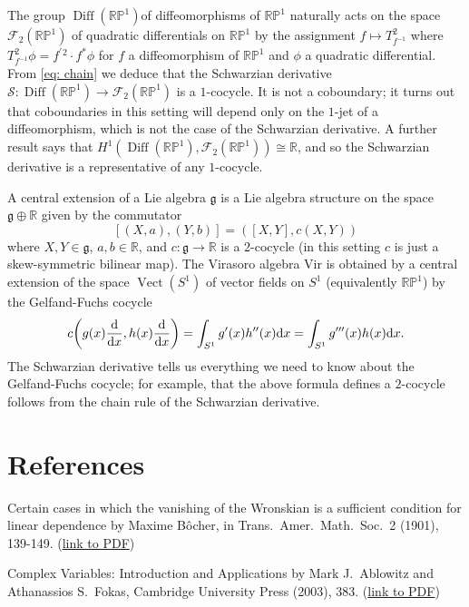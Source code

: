 \documentclass[11pt,leqno]{article}
\theoremstyle{plain}
\theoremstyle{definition}
\numberwithin{equation}{section}
\numberwithin{lem}{section}
\DeclareMathOperator{\Diff}{Diff}
\newcommand{\Vir}{\mathrm{Vir}}
\DeclareMathOperator{\Vect}{Vect}
\begin{document}
The group $\Diff(\mathbb{RP}^1)$of diffeomorphisms of $\mathbb{RP}^1$ naturally acts on the space $\mathcal F_2(\mathbb{RP}^1)$ of quadratic differentials on $\mathbb{RP}^1$ by the assignment $f\mapsto T^2_{f^{-1}}$ where $T^2_{f^{-1}}\phi = f^\prime{}^2\cdot f^\ast\phi$ for $f$ a diffeomorphism of $\mathbb{RP}^1$ and $\phi$ a quadratic differential. From \cref{eq: chain} we deduce that the Schwarzian derivative $\mathscr S\colon \Diff(\mathbb{RP}^1)\to \mathcal F_2(\mathbb{RP}^1)$ is a $1$-cocycle. It is not a coboundary; it turns out that coboundaries in this setting will depend only on the $1$-jet of a diffeomorphism, which is not the case of the Schwarzian derivative. A further result says that $H^1(\Diff(\mathbb{RP}^1), \mathcal F_2(\mathbb{RP}^1)) \cong \mathbb R$, and so the Schwarzian derivative is a representative of any $1$-cocycle.

A central extension of a Lie algebra $\mathfrak g$ is a Lie algebra structure on the space $\mathfrak g\oplus \mathbb R$ given by the commutator
\[[(X,a), (Y,b)] = ([X,Y], c(X,Y))\]
where $X,Y\in \mathfrak g$, $a,b\in\mathbb R$, and $c\colon \mathfrak g \to \mathbb R$ is a $2$-cocycle (in this setting $c$ is just a skew-symmetric bilinear map). The Virasoro algebra $\Vir$ is obtained by a central extension of the space $\Vect(S^1)$ of vector fields on $S^1$ (equivalently $\mathbb{RP}^1$) by the Gelfand-Fuchs cocycle
\[c\biggl(g(x)\dv{x}, h(x)\dv{x}\biggr) = \int_{S^1}g^\prime(x)h^{\prime\prime}(x)\dd x = \int_{S^1}g'''(x)h(x)\dd x.\] The Schwarzian derivative tells us everything we need to know about the Gelfand-Fuchs cocycle; for example, that the above formula defines a $2$-cocycle follows from the chain rule of the Schwarzian derivative.

\newpage\section*{References}

Certain cases in which the vanishing of the Wronskian is a sufficient condition for linear dependence by Maxime B\^ocher, in Trans.~Amer.~Math.~Soc.~2 (1901), 139-149. (\href{https://www.ams.org/journals/tran/1901-002-02/S0002-9947-1901-1500560-5/S0002-9947-1901-1500560-5.pdf}{link to PDF})

Complex Variables: Introduction and Applications by Mark J.~Ablowitz and Athanassios S.~Fokas, Cambridge University Press (2003), 383. (\href{https://ftfsite.ru/wp-content/files/tfkp_endlish_2.2.pdf}{link to PDF})
\end{document}
